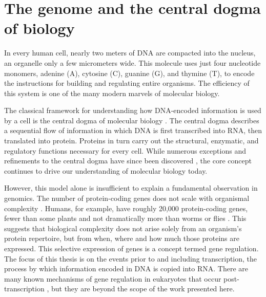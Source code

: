 \begin{dissertationintroduction}
    
\setcounter{chapter}{0}

\label{chap:introduction}

\section{The genome and the central dogma of biology}
In every human cell, nearly two meters of DNA are compacted into the nucleus, an organelle only a few micrometers wide. This molecule uses just four nucleotide monomers, adenine (A), cytosine (C), guanine (G), and thymine (T), to encode the instructions for building and regulating entire organisms. The efficiency of this system is one of the many modern marvels of molecular biology.

The classical framework for understanding how DNA-encoded information is used by a cell is the central dogma of molecular biology \cite{Crick1958-tb}. The central dogma describes a sequential flow of information in which DNA is first transcribed into RNA, then translated into protein. Proteins in turn carry out the structural, enzymatic, and regulatory functions necessary for every cell. While numerous exceptions and refinements to the central dogma have since been discovered \cite{UnknownUnknown-tl,Crick1970-lz}, the core concept continues to drive our understanding of molecular biology today.

However, this model alone is insufficient to explain a fundamental observation in genomics. The number of protein-coding genes does not scale with organismal complexity \cite{Levine2003-ra}. Humans, for example, have roughly 20,000 protein-coding genes, fewer than some plants \cite{Lian2024-mt} and not dramatically more than worms \cite{Hobert2013-gh} or flies \cite{Alberts2002-ib}. This suggests that biological complexity does not arise solely from an organism’s protein repertoire, but from when, where and how much those proteins are expressed. This selective expression of genes is a concept termed gene regulation. The focus of this thesis is on the events prior to and including transcription, the process by which information encoded in DNA is copied into RNA. There are many known mechanisms of gene regulation in eukaryotes that occur post-transcription \cite{Zhao2017-hm,Keene2007-iy}, but they are beyond the scope of the work presented here.


\end{dissertationintroduction}
